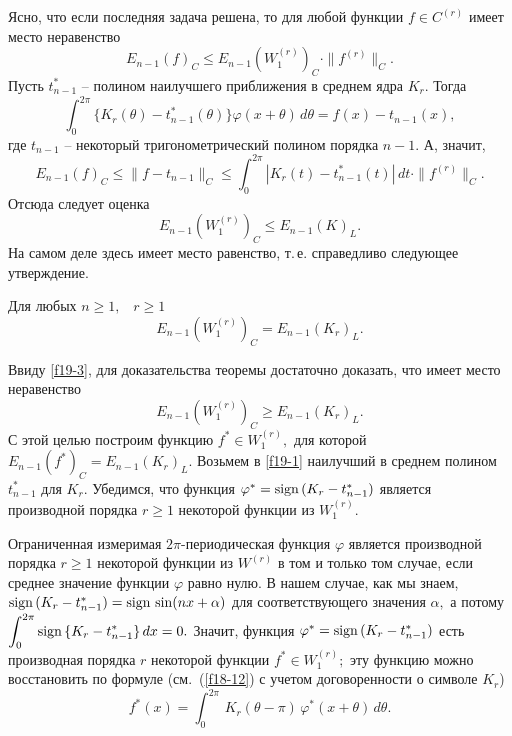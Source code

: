  Ясно, что если последняя задача решена, то для любой функции $f\in C^{(r)}$
 имеет место неравенство
 $$
 E_{n-1}(f)_C\le E_{n-1}(W_1^{(r)})_C\cdot \|f^{(r)}\|_C.
 $$
 Пусть $t_{n-1}^*$ -- полином наилучшего приближения  в среднем ядра $K_r.$
 Тогда
 \begin{equation}\label{f19-1}
 \int_0^{2\pi} \{ K_r(\theta)-t_{n-1}^{*}(\theta)\}\varphi(x+\theta)
 \,d\theta=f(x)-t_{n-1}(x),%
 \end{equation}
 где  $t_{n-1}$ -- некоторый тригонометрический полином порядка $n-1.$ А, значит,
 \begin{equation}\label{f19-2}
 E_{n-1}(f)_C\le \|f-t_{n-1}\|_C\le \int_0^{2\pi}
 |K_r(t)-t_{n-1}^{*}(t)|\, dt\cdot \|f^{(r)}\|_C. %
 \end{equation}
 Отсюда следует оценка
 \begin{equation}\label{f19-3}
 E_{n-1}(W_1^{(r)})_C\le E_{n-1}(K)_L. %
 \end{equation}
 На самом деле здесь имеет место равенство, т.\,е. справедливо следующее утверждение.

 \begin{teo}[Фавар] Для любых $n\ge 1,$~ $r\ge 1$
 $$
 E_{n-1}(W_1^{(r)})_C= E_{n-1}(K_r)_L.
 $$
 \end{teo}

Ввиду \eqref{f19-3}, для доказательства теоремы  достаточно доказать,
 что имеет место неравенство
 $$
 E_{n-1}(W_1^{(r)})_C\ge E_{n-1}(K_r)_L.
 $$
 С этой целью построим функцию $f^*\in W_1^{(r)},$ для которой
 $E_{n-1}(f^*)_C=E_{n-1}(K_r)_L.$
 Возьмем в {\eqref{f19-1}} наилучший в среднем полином
 $t_{n-1}^*$ для $K_r.$ Убедимся, что функция $\varphi^*={\rm sign \, } (K_r-t_{n-1}^*)$
 является производной порядка $r\ge 1$ некоторой функции из
 $W_1^{(r)}.$

 Ограниченная измеримая $2\pi$-периодическая функция $\varphi$
 является  производной порядка $r\ge 1$ некоторой функции из
  $W^{(r)}$ в том и только  том случае, если  среднее значение функции
  $\varphi$ равно нулю. В нашем
 случае, как мы знаем, ${\rm sign \, } (K_r-t_{n-1}^*)={\rm sign \, } \sin(nx+\alpha)$
 для соответствующего значения $\alpha,$ а потому $\displaystyle\int_0^{2\pi}{\rm sign \, } \{
 K_r-t_{n-1}^*\}\, dx=0.$ Значит, функция $\varphi^*={\rm sign \, }(K_r-t^*_{n-1})$
 есть производная порядка $r$  некоторой функции $f^*\in W_1^{(r)};$
 эту функцию  можно восстановить по формуле (см.~(\ref{f18-12}) с учетом
 договоренности о символе $K_r$)
 $$
 f^*(x)=\int_0^{2\pi}\, K_r(\theta-\pi)\,
 \varphi^*(x+\theta)\, d\theta.
 $$


